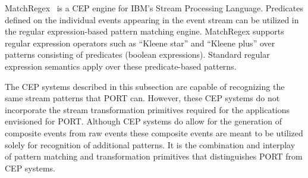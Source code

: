 MatchRegex~\cite{DBLP:conf/debs/Hirzel12} is a CEP engine for IBM’s Stream Processing
Language. Predicates defined on the individual events appearing in the event
stream can be utilized in the regular expression-based pattern matching
engine. MatchRegex supports regular expression operators such as “Kleene star”
and “Kleene plus” over patterns consisting of predicates (boolean expressions).
Standard regular expression semantics apply over these predicate-based patterns.

The CEP systems described in this subsection are capable 
of recognizing the same stream patterns that PORT can. 
However, these CEP systems do not incorporate the 
stream transformation primitives required for the applications
envisioned for PORT. Although CEP systems do allow for the
generation of composite events from raw events these composite events
are meant to be utilized solely for recognition of additional patterns. 
It is the combination and interplay of pattern matching and transformation
primitives that distinguishes PORT from CEP systems.   

